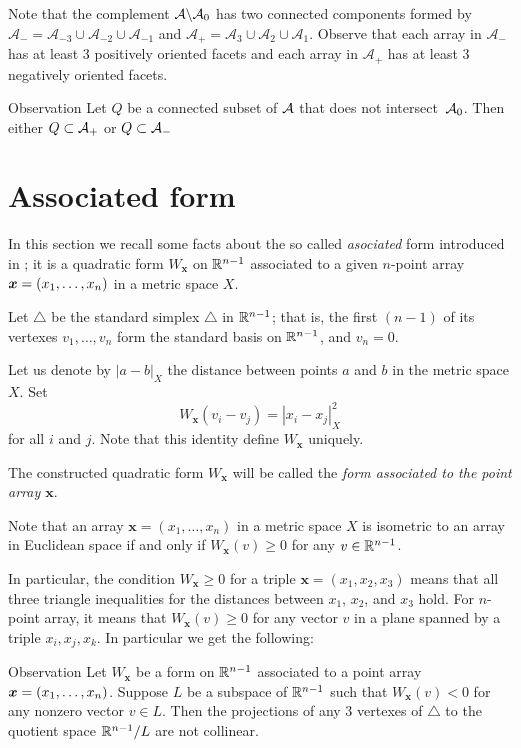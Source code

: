 \documentclass{article}
\begin{document}
Note that the complement $\mathcal{A}\backslash \mathcal{A}_0$ has two connected components formed by $\mathcal{A}_{-}=\mathcal{A}_{-3}\cup \mathcal{A}_{-2}\cup\mathcal{A}_{-1}$ and $\mathcal{A}_{+}=\mathcal{A}_{3}\cup \mathcal{A}_{2}\cup\mathcal{A}_{1}$.
Observe that each array in $\mathcal{A}_{-}$ has at least 3 positively oriented facets and each array in $\mathcal{A}_{+}$ has at least 3 negatively oriented facets.

\begin{thm}{Observation}\label{obs:connectedA}
Let $Q$ be a connected subset of $\mathcal{A}$ that does not intersect~$\mathcal{A}_0$.
Then either $Q\subset \mathcal{A}_+$ or $Q\subset \mathcal{A}_-$
\end{thm}


\section{Associated form}

In this section we recall some facts about the so called \emph{asociated} form introduced in \cite{petrunin-2017};
it is a quadratic form 
$W_{\bm{x}}$ on $\mathbb{R}^{n-1}$ associated
to a given $n$-point array $\bm{x}\z=(x_1,\dots,x_n)$ in a metric space $X$.

Let $\triangle$ be the standard simplex $\triangle$ in $\mathbb{R}^{n-1}$; that is, the first $(n-1)$ of its vertexes $v_1,\dots,v_n$ form the standard basis on $\mathbb{R}^{n-1}$,
 and $v_n=0$.

Let us denote by $|a-b|_X$ the distance between points $a$ and $b$ in the metric space $X$.
Set
\[W_{\bm{x}}(v_i-v_j)=|x_i-x_j|^2_X\] 
for all $i$ and $j$.
Note that this identity define $W_{\bm{x}}$ uniquely.


The constructed quadratic form $W_{\bm{x}}$ will be called the \emph{form associated to the point array $\bm{x}$}.

Note that an array $\bm{x}=(x_1,\dots,x_n)$ in a metric space $X$ is isometric to an array in Euclidean space if and only if 
$W_{\bm{x}}(v)\ge 0$
for any $v\in \mathbb{R}^{n-1}$.

In particular,  the
condition $W_{\bm{x}}\ge 0$ for a triple $\bm{x}=(x_1,x_2,x_3)$ means that 
all three triangle inequalities for the distances between $x_1$, $x_2$, and $x_3$ hold.
For $n$-point array, it means that $W_{\bm{x}}(v)\ge 0$ for any vector $v$ in a plane spanned by a triple $x_i,x_j,x_k$.
In particular we get the following:

\begin{thm}{Observation}\label{triangle-inq}
Let $W_{\bm{x}}$ be a form on $\mathbb{R}^{n-1}$ associated to a point array $\bm{x}\z=(x_1,\dots,x_n)$.
Suppose $L$ be a subspace of $\mathbb{R}^{n-1}$ such that
$W_{\bm{x}}(v)< 0$ for any nonzero vector $v\in L$.
Then the projections of any 3 vertexes of $\triangle$ to the quotient space $\mathbb{R}^{n-1}/L$ are not collinear.
\end{thm}
\end{document}
